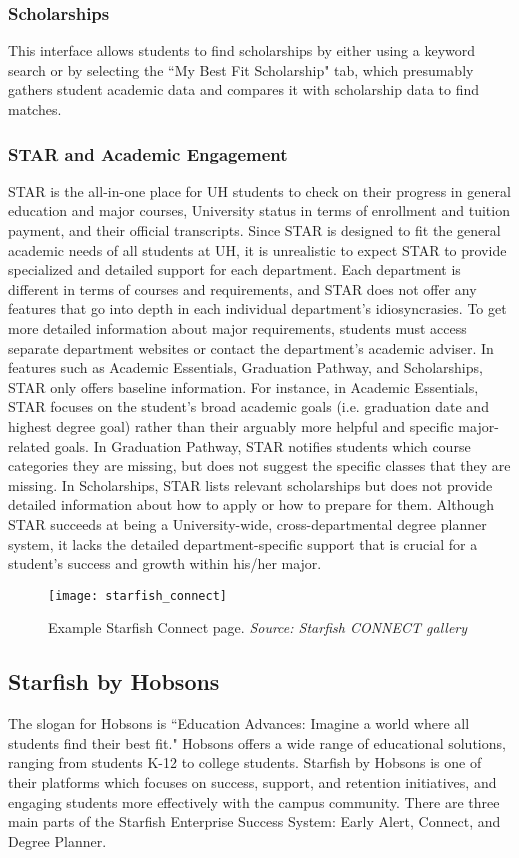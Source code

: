 \subsubsection{Scholarships}
This interface allows students to find scholarships by either using a keyword search or by selecting the ``My Best Fit Scholarship" tab, which presumably gathers student academic data and compares it with scholarship data to find matches.

\subsubsection{STAR and Academic Engagement}
STAR is the all-in-one place for UH students to check on their progress in general education and major courses, University status in terms of enrollment and tuition payment, and their official transcripts. Since STAR is designed to fit the general academic needs of all students at UH, it is unrealistic to expect STAR to provide specialized and detailed support for each department. Each department is different in terms of courses and requirements, and STAR does not offer any features that go into depth in each individual department's idiosyncrasies. To get more detailed information about major requirements, students must access separate department websites or contact the department's academic adviser. 
In features such as Academic Essentials, Graduation Pathway, and Scholarships, STAR only offers baseline information. For instance, in Academic Essentials, STAR focuses on the student's broad academic goals (i.e. graduation date and highest degree goal) rather than their arguably more helpful and specific major-related goals. In Graduation Pathway, STAR notifies students which course categories they are missing, but does not suggest the specific classes that they are missing. In Scholarships, STAR lists relevant scholarships but does not provide detailed information about how to apply or how to prepare for them. Although STAR succeeds at being a University-wide, cross-departmental degree planner system, it lacks the detailed department-specific support that is crucial for a student's success and growth within his/her major. 

\begin{figure}[h]
\centering
\texttt{[image: starfish\_connect]}
\caption{Example Starfish Connect page. \textit{Source: Starfish CONNECT gallery}}
\end{figure}
\subsection{Starfish by Hobsons}
The slogan for Hobsons is ``Education Advances: Imagine a world where all students find their best fit." Hobsons offers a wide range of educational solutions, ranging from students K-12 to college students. Starfish by Hobsons is one of their platforms which focuses on success, support, and retention initiatives, and engaging students more effectively with the campus community. There are three main parts of the Starfish Enterprise Success System: Early Alert, Connect, and Degree Planner.
